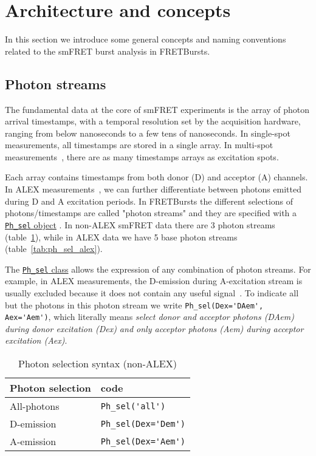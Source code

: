 \section{Architecture and concepts}
\label{sec:concepts}

In this section we introduce some general concepts and naming conventions related
to the smFRET burst analysis in FRETBursts.

\subsection{Photon streams}
\label{sec:ph_streams}

The fundamental data at the core of smFRET experiments is the array of photon
arrival timestamps, with a temporal resolution set by the acquisition hardware,
ranging from below nanoseconds to a few tens of nanoseconds.
In single-spot
measurements, all timestamps are stored in a single array. In multi-spot
measurements~\cite{Ingargiola_2013}, there are as many timestamps arrays
as excitation spots.

Each array contains timestamps from both donor (D) and acceptor (A) channels.
In ALEX measurements~\cite{Lee_2005}, we can further differentiate between
photons emitted during D and A excitation periods. In FRETBursts the different
selections of photons/timestamps are called "photon streams" and they are
specified with a
\href{http://fretbursts.readthedocs.org/en/latest/ph_sel.html}{\texttt{Ph\_sel}
object} . In non-ALEX smFRET data there are 3 photon streams
(table~\ref{tab:ph_sel_smfret}), while in ALEX data we have 5 base photon
streams (table~\ref{tab:ph_sel_alex}).

The
\href{http://fretbursts.readthedocs.org/en/latest/ph_sel.html}{\texttt{Ph\_sel}
class} allows the expression of any combination of photon streams.
For example, in ALEX measurements, the D-emission during A-excitation stream is
usually excluded because it does not contain any useful signal~\cite{Lee_2005}.
To indicate all but the photons in this photon stream we write
\verb|Ph_sel(Dex='DAem', Aex='Aem')|, which literally means \textit{select donor
and acceptor photons (DAem) during donor excitation (Dex) and only acceptor
photons (Aem) during acceptor excitation (Aex)}.

\begin{table}
\begin{tabular}{l|l}
  Photon selection  & code \\
  \hline
  All-photons       & \verb|Ph_sel('all')|\\
  D-emission    & \verb|Ph_sel(Dex='Dem')|\\
  A-emission & \verb|Ph_sel(Dex='Aem')|\\
\end{tabular}
\caption{\label{tab:ph_sel_smfret}Photon selection syntax (non-ALEX)}
\end{table}

